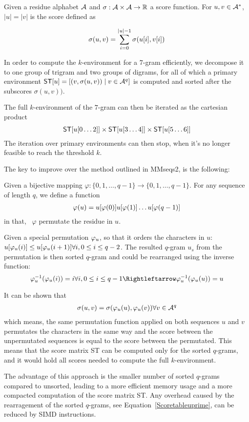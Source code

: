 Given a residue alphabet \(\mathcal{A}\) and
\(\sigma:\mathcal{A}\times\mathcal{A}\to\mathbb{R}\)  a score function. For
\(u,v\in\mathcal{A}^{\ast}\), \(|u|=|v|\) is the score defined as

$$\sigma(u,v)=\sum_{i=0}^{|u|-1}\sigma(u\lbrack i\rbrack,v\lbrack i\rbrack)$$

In order to compute the $k$-environment for a \(7\)-gram efficiently, we decompose it to one group of trigram and two groups of digrams, for all of which a primary environment \(\mathsf{ST}\lbrack u\rbrack=\lbrack (v,\sigma(u,v))\mid v\in\mathcal{A}^{q}\rbrack\) is computed and sorted after the subscores \(\sigma(u,v))\).

The full $k$-environment of the \(7\)-gram can then be iterated as the cartesian product
\begin{align}
\mathsf{ST}\lbrack u\lbrack 0\ldots2\rbrack\rbrack\times \mathsf{ST}\lbrack u\lbrack 3\ldots4\rbrack\rbrack\times
\mathsf{ST}\lbrack u\lbrack 5\ldots6\rbrack\rbrack\label{ScoreTablesCartesian}
\end{align}
The iteration over primary environments can then stop, when it's no longer feasible to reach the threshold \(k\).

The key to improve over the method outlined in MMseqs2, is the following:

Given a bijective mapping \(\varphi:\{0,1,\ldots,q-1\}\to \{0,1,\ldots,q-1\}\). For any sequence of length \(q\),  we define a function
\begin{align}
\varphi(u)=u\lbrack \varphi(0)\rbrack u\lbrack \varphi(1)\rbrack\ldots u\lbrack \varphi(q-1)\rbrack  
\end{align}
in that, \ \(\varphi\) permutate the residue in \(u\).

Given a special permutation \(\varphi_{u}\), so that it orders the characters in \(u\): \(u\lbrack \varphi_{u}(i)\rbrack\leq u\lbrack \varphi_{u}(i+1)\rbrack\forall i, 0\leq i\leq q-2\). The resulted \(q\)-gram \(u_s\) from the permutation is then sorted \(q\)-gram and could be rearranged using the inverse function:
\begin{align}
\Perminverse{u}{\Perm{u}{i}}=i \forall i, 0\leq i\leq q-1 \Rightleftarrow \Perminverse{u}{\Perm{u}{u}}=u
\end{align}

It can be shown that
\begin{align}
\sigma(u,v)=\sigma(\varphi_{u}(u),\varphi_{u}(v)) \forall v\in\mathcal{A}^{q}
\end{align}
which means, the same permutation function applied on both sequences \(u\) and \(v\)
permutates the characters in the same way and the score between the unpermutated sequences is equal to the score between the permutated. This means that the score matrix ST can be computed only for the sorted \(q\)-grams, and it would hold all scores needed to compute the full $k$-environment.

The advantage of this approach is the smaller number of sorted $q$-grams compared to unsorted, leading to a more efficient memory usage and a more compacted computation of the score matrix ST. Any overhead caused by the rearragement of the sorted $q$-grams, see Equation~\ref{Scoretableuprime}, can be reduced by SIMD instructions.